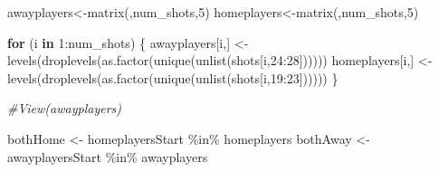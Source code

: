 \documentclass[
]{article}
\newenvironment{Shaded}{\begin{snugshade}}{\end{snugshade}}
\newcommand{\CommentTok}[1]{\textcolor[rgb]{0.56,0.35,0.01}{\textit{#1}}}
\newcommand{\ControlFlowTok}[1]{\textcolor[rgb]{0.13,0.29,0.53}{\textbf{#1}}}
\newcommand{\DecValTok}[1]{\textcolor[rgb]{0.00,0.00,0.81}{#1}}
\newcommand{\FunctionTok}[1]{\textcolor[rgb]{0.00,0.00,0.00}{#1}}
\newcommand{\NormalTok}[1]{#1}
\newcommand{\OtherTok}[1]{\textcolor[rgb]{0.56,0.35,0.01}{#1}}
\newcommand{\SpecialCharTok}[1]{\textcolor[rgb]{0.00,0.00,0.00}{#1}}
\begin{document}
\begin{Shaded}
\begin{Highlighting}[]
\NormalTok{awayplayers}\OtherTok{\textless{}{-}}\FunctionTok{matrix}\NormalTok{(,num\_shots,}\DecValTok{5}\NormalTok{)}
\NormalTok{homeplayers}\OtherTok{\textless{}{-}}\FunctionTok{matrix}\NormalTok{(,num\_shots,}\DecValTok{5}\NormalTok{)}

\ControlFlowTok{for}\NormalTok{ (i }\ControlFlowTok{in} \DecValTok{1}\SpecialCharTok{:}\NormalTok{num\_shots) \{}
\NormalTok{  awayplayers[i,] }\OtherTok{\textless{}{-}} \FunctionTok{levels}\NormalTok{(}\FunctionTok{droplevels}\NormalTok{(}\FunctionTok{as.factor}\NormalTok{(}\FunctionTok{unique}\NormalTok{(}\FunctionTok{unlist}\NormalTok{(shots[i,}\DecValTok{24}\SpecialCharTok{:}\DecValTok{28}\NormalTok{])))))}
\NormalTok{  homeplayers[i,] }\OtherTok{\textless{}{-}} \FunctionTok{levels}\NormalTok{(}\FunctionTok{droplevels}\NormalTok{(}\FunctionTok{as.factor}\NormalTok{(}\FunctionTok{unique}\NormalTok{(}\FunctionTok{unlist}\NormalTok{(shots[i,}\DecValTok{19}\SpecialCharTok{:}\DecValTok{23}\NormalTok{])))))}
\NormalTok{\}}

\CommentTok{\#View(awayplayers)}

\NormalTok{bothHome }\OtherTok{\textless{}{-}}\NormalTok{ homeplayersStart }\SpecialCharTok{\%in\%}\NormalTok{ homeplayers}
\NormalTok{bothAway }\OtherTok{\textless{}{-}}\NormalTok{ awayplayersStart }\SpecialCharTok{\%in\%}\NormalTok{ awayplayers}
\end{Highlighting}
\end{Shaded}
\end{document}
